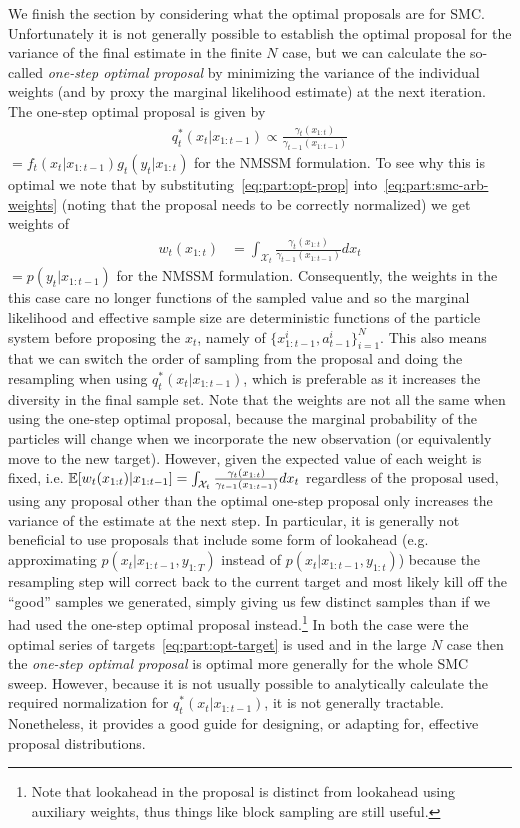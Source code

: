We finish the section by considering what the optimal proposals are for SMC.  Unfortunately it is not generally
possible to establish the optimal proposal for the variance of the final estimate in the finite $N$ case, but we can
calculate the so-called \emph{one-step optimal proposal} by minimizing the variance of the individual weights (and
by proxy the marginal likelihood estimate) at the next iteration.  The one-step optimal proposal is given by
\begin{align}
\label{eq:part:opt-prop}
q_t^*(x_t | x_{1:t-1}) \propto \frac{\gamma_t({x}_{1:t})}{\gamma_{t - 1}({x}_{1:t - 1})} 
\end{align}
$= f_t(x_t | x_{1:t-1}) g_t(y_t | x_{1:t})$ for the NMSSM formulation.  To see why this is optimal we note that
by substituting~\eqref{eq:part:opt-prop} into~\eqref{eq:part:smc-arb-weights} (noting that the proposal needs
to be correctly normalized) we get weights of
\begin{align}
w_t(x_{1:t}) &= \int_{\mathcal{X}_t} \frac{\gamma_t({x}_{1:t})}{\gamma_{t - 1}({x}_{1:t - 1})} dx_t
\end{align}
$=p(y_t | x_{1:t-1})$ for the NMSSM formulation.  Consequently, the weights in the this case care no longer
functions of the sampled value and so the marginal likelihood and effective sample size are deterministic
functions of the particle system before proposing the $x_{t}$, namely of $\{x_{1:t-1}^i,a_{t-1}^i\}_{i=1}^N$.
This also means that we can switch the order of sampling from the proposal and doing the resampling when
using $q_t^*(x_t | x_{1:t-1})$, which is preferable as it increases the diversity in the final sample set.
Note that the weights are not all the same when using the one-step optimal proposal, because
the marginal probability of the particles will change when we incorporate the new observation (or equivalently
move to the new target).  However, given the expected value of each weight is fixed, i.e. $\mathbb{E} [w_t(x_{1:t}) | x_{1:t-1}]=
\int_{\mathcal{X}_t} \frac{\gamma_t({x}_{1:t})}{\gamma_{t - 1}({x}_{1:t - 1})} dx_t$ regardless of the proposal
used, using any proposal other than the optimal one-step proposal only increases the variance of the estimate
at the next step.  In particular, it is generally
not beneficial to use proposals that include some form of lookahead (e.g. approximating $p(x_{t} |x_{1:t-1},y_{1:T})$
instead of $p(x_{t} |x_{1:t-1},y_{1:t})$) because the resampling step will correct back to the current target and
most likely kill off the ``good'' samples we generated, simply giving us few distinct samples than if we had
used the one-step optimal proposal instead.\footnote{Note that lookahead in the proposal is distinct from
	lookahead using auxiliary weights, thus things like block sampling are still useful.}
In both the case were the optimal series of targets~\eqref{eq:part:opt-target} is used and in the large $N$ case then
the \emph{one-step optimal proposal} is optimal more generally for the whole SMC sweep.  However, because it is
not usually possible to analytically calculate the required normalization for $q_t^*(x_t | x_{1:t-1})$, it is
not generally tractable.  Nonetheless, it provides a good guide for designing, or adapting for, effective proposal
distributions.